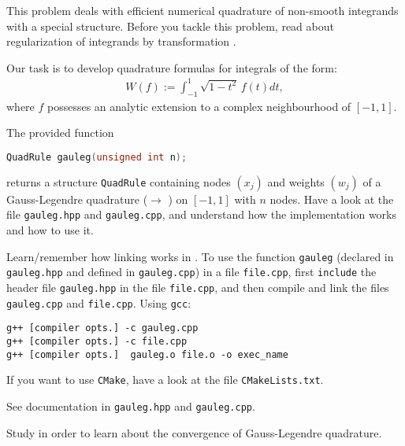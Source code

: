 
\begin{problem}
\label{prb:effquadsing}
 
 This problem deals with efficient numerical quadrature of non-smooth integrands with a special structure. Before you tackle this problem, read about regularization of integrands by transformation .

 Our task is to develop quadrature formulas for integrals of the form:
 \begin{align} \label{eq:effquadsingint}
  W(f) := \int_{-1}^1 \sqrt{1 - t^2}\, f(t) dt,
 \end{align}
 where $f$ possesses an analytic extension to a complex neighbourhood of $[-1,1]$.

 \begin{subproblem}[1]
 The provided function
 \begin{lstlisting}[language=c++]
  QuadRule gauleg(unsigned int n);
 \end{lstlisting}
 returns a structure \verb|QuadRule| containing nodes $(x_j)$ and weights $(w_j)$
 of a Gauss-Legendre quadrature ($\to$ ) on $[-1,1]$ with $n$
 nodes. Have a look at the file \verb|gauleg.hpp| and \verb|gauleg.cpp|, and
 understand how the implementation works and how to use it.
 
  \cprotEnv \begin{hint}
   Learn/remember how linking works in \Cpp{}. To use the function \verb|gauleg| (declared in \verb|gauleg.hpp| and defined in \verb|gauleg.cpp|) in a file \verb|file.cpp|, first \verb|include| the header file \verb|gauleg.hpp| in the file \verb|file.cpp|, and then compile and link the files \verb|gauleg.cpp| and \verb|file.cpp|. Using \verb|gcc|:
   \begin{lstlisting}
g++ [compiler opts.] -c gauleg.cpp
g++ [compiler opts.] -c file.cpp
g++ [compiler opts.]  gauleg.o file.o -o exec_name
   \end{lstlisting}
   If you want to use \verb|CMake|, have a look at the file \verb|CMakeLists.txt|.
  \end{hint}
  
  \cprotEnv \begin{solution}
   See documentation in \verb|gauleg.hpp| and \verb|gauleg.cpp|.
  \end{solution}
 \end{subproblem}

 \begin{subproblem}[1]
   Study  in order to learn about the convergence of
   Gauss-Legendre quadrature. 
 \end{subproblem}


\end{problem}
